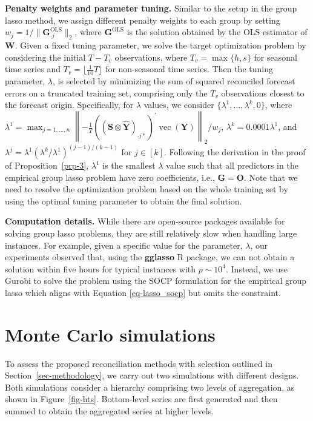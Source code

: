 \documentclass[
  11pt]{article}
\theoremstyle{plain}
\theoremstyle{remark}
\begin{document}
\textbf{Penalty weights and parameter tuning.} Similar to the setup in
the group lasso method, we assign different penalty weights to each
group by setting \(w_j = 1/\|\bm{G}_{\cdot j}^{\text{OLS}}\|_2\), where
\(\bm{G}^{\text{OLS}}\) is the solution obtained by the OLS estimator of
\(\bm{W}\). Given a fixed tuning parameter, we solve the target
optimization problem by considering the initial \(T-T_v\) observations,
where \(T_v = \max\{h, s\}\) for seasonal time series and
\(T_v = \lfloor \frac{1}{10}T \rfloor\) for non-seasonal time series.
Then the tuning parameter, \(\lambda\), is selected by minimizing the
sum of squared reconciled forecast errors on a truncated training set,
comprising only the \(T_v\) observations closest to the forecast origin.
Specifically, for \(\lambda\) values, we consider
\(\{\lambda^{1},\dots,\lambda^{k}, 0\}\),
 where
\(\lambda^{1} = \max_{j=1, \ldots, n}\left\|-\frac{1}{T}\left(\left(\bm{S} \otimes \hat{\bm{Y}}\right)_{\cdot j*}\right)^{\prime} \operatorname{vec}(\bm{Y})\right\|_2 / w_j\),
\(\lambda^{k} = 0.0001\lambda^{1}\), and
\(\lambda^{j} = \lambda^{1}\left(\lambda^{k} / \lambda^{1}\right)^{(j-1) / (k-1)}\)
for \(j \in [k]\). Following the derivation in the proof of
Proposition~\ref{prp-3}, \(\lambda^{1}\) is the smallest \(\lambda\)
value such that all predictors in the empirical group lasso problem have
zero coefficients, i.e., \(\bm{G} = \bm{O}\). Note that we need to
resolve the optimization problem based on the whole training set by
using the optimal tuning parameter to obtain the final solution.

\textbf{Computation details.} While there are open-source packages
available for solving group lasso problems, they are still relatively
slow when handling large instances. For example, given a specific value
for the parameter, \(\lambda\), our experiments observed that, using the
\textbf{gglasso} R package, we can not obtain a solution within five
hours for typical instances with \(p \sim 10^4\). Instead, we use Gurobi
to solve the problem using the SOCP formulation for the empirical group
lasso which aligns with Equation \eqref{eq-lasso_socp} but omits the
constraint.

\section{Monte Carlo simulations}\label{sec-simulations}

To assess the proposed reconciliation methods with selection outlined in
Section~\ref{sec-methodology}, we carry out two simulations with
different designs. Both simulations consider a hierarchy comprising two
levels of aggregation, as shown in Figure~\ref{fig-hts}. Bottom-level
series are first generated and then summed to obtain the aggregated
series at higher levels.
\end{document}
